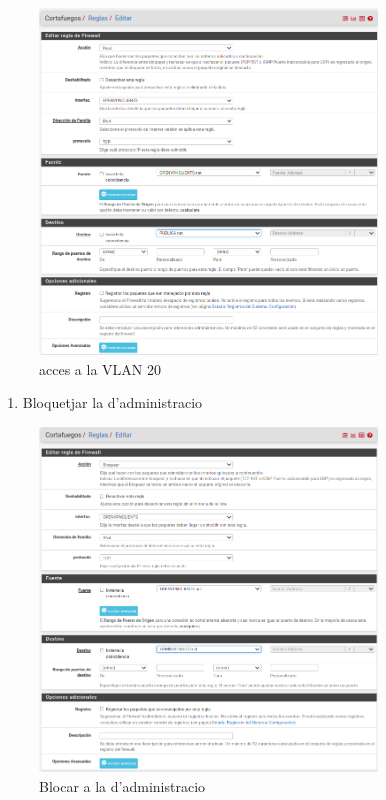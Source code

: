 \documentclass[
  10pt,
]{krantz}
\providecommand{\tightlist}{%
  \setlength{\itemsep}{0pt}\setlength{\parskip}{0pt}}
\begin{document}
\begin{figure}
\centering
\includegraphics[width=0.8\textwidth,height=\textheight]{imatges/proxmox/regla_vpn_privat.png}
\caption{acces a la VLAN 20}
\end{figure}

\begin{enumerate}
\def\labelenumi{\arabic{enumi}.}
\setcounter{enumi}{1}
\tightlist
\item
  Bloquetjar la d'administracio
\end{enumerate}

\begin{figure}
\centering
\includegraphics[width=0.8\textwidth,height=\textheight]{imatges/proxmox/regla_vpn_admin.png}
\caption{Blocar a la d'administracio}
\end{figure}
\end{document}
